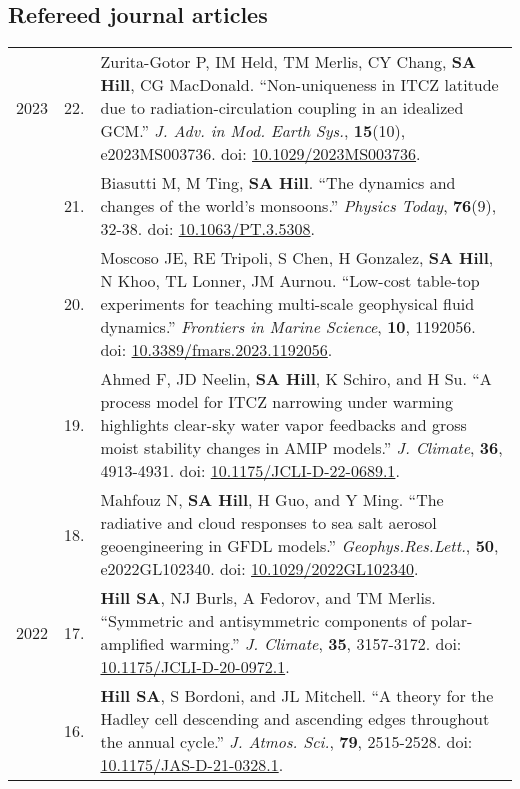 \documentclass[letterpaper,11pt]{shillcv}
\begin{document}
\subsection*{Refereed journal articles}
\begin{longtable}{@{} Y{0.05\textwidth} >{\color{black}} p{0.04\textwidth} @{} L{0.91\textwidth} @{}}
2023 & 22. & Zurita-Gotor P, IM Held, TM Merlis, CY Chang, \textbf{SA Hill}, CG MacDonald.  ``Non-uniqueness in ITCZ latitude due to radiation-circulation coupling in an idealized GCM.'' \emph{J.  Adv. in Mod. Earth Sys.}, \textbf{15}(10), e2023MS003736.  doi: \href{https://doi.org/10.1029/2023MS003736}{10.1029/2023MS003736}.\\
     & 21. & Biasutti M, M Ting, \textbf{SA Hill}. ``The dynamics and changes of the world’s monsoons.''  \emph{Physics Today}, \textbf{76}(9), 32-38.  doi: \href{https://doi.org/10.1063/PT.3.5308}{10.1063/PT.3.5308}.\\
     & 20. & Moscoso JE, RE Tripoli, S Chen, H Gonzalez, \textbf{SA Hill}, N Khoo, TL Lonner, JM Aurnou. ``Low-cost table-top experiments for teaching
multi-scale geophysical fluid dynamics.''  \emph{Frontiers in Marine Science}, \textbf{10}, 1192056.  doi:  \href{https://doi.org/10.3389/fmars.2023.1192056}{10.3389/fmars.2023.1192056}.\\
     & 19. & Ahmed F, JD Neelin, \textbf{SA Hill}, K Schiro, and H Su. ``A process model for ITCZ narrowing under warming highlights clear-sky water vapor feedbacks and gross moist stability changes in AMIP models.'' \emph{J. Climate}, \textbf{36}, 4913-4931.  doi: \href{https://doi.org/10.1175/JCLI-D-22-0689.1}{10.1175/JCLI-D-22-0689.1}.\\
     & 18. & Mahfouz N, \textbf{SA Hill}, H Guo, and Y Ming. ``The radiative and cloud responses to sea salt aerosol geoengineering in GFDL models.''  \emph{Geophys.\@ Res.\@ Lett.}, \textbf{50}, e2022GL102340.  doi: \href{https://doi.org/10.1029/2022GL102340}{10.1029/2022GL102340}.\\
2022 & 17. & \textbf{Hill SA}, NJ Burls, A Fedorov, and TM Merlis.  ``Symmetric and antisymmetric components of polar-amplified warming.''  \emph{J. Climate}, \textbf{35}, 3157-3172.  doi: \href{https://doi.org/10.1175/JCLI-D-20-0972.1}{10.1175/JCLI-D-20-0972.1}.\\
     & 16. & \textbf{Hill SA}, S Bordoni, and JL Mitchell.  ``A theory for the Hadley cell descending and ascending edges throughout the annual cycle.''  \emph{J. Atmos. Sci.}, \textbf{79}, 2515-2528.  doi: \href{https://doi.org/10.1175/JAS-D-21-0328.1}{10.1175/JAS-D-21-0328.1}.\\

\end{longtable}
\end{document}
